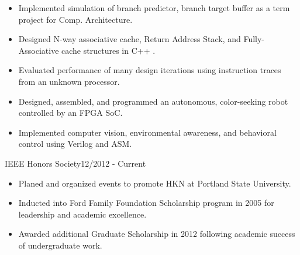 \documentclass{article}
\begin{document}
		\begin{itemize} \setlength{\itemsep}{-4pt}
			\item Implemented simulation of branch predictor, branch target buffer as a term project for Comp. Architecture.
			\item Designed N-way associative cache, Return Address Stack, and Fully-Associative cache structures in C++	.
			\item Evaluated performance of many design iterations using instruction traces from an unknown processor.
		\end{itemize}	
	
	
	\begin{itemize}\setlength{\itemsep}{-4pt}
		\item Designed, assembled, and programmed an autonomous, color-seeking robot controlled by an FPGA SoC.  
		\item Implemented computer vision, environmental awareness, and behavioral control using Verilog and ASM.
	\end{itemize}

		
\vspace{-10pt}
\vspace{3pt}

 {IEEE Honors Society}{12/2012 - Current}

	\begin{itemize} \setlength{\itemsep}{-4pt}	
		\item Planed and organized events to promote HKN at Portland State University.
	\end{itemize}	\vspace{-2pt}


	\begin{itemize} \setlength{\itemsep}{-4pt}
		\item Inducted into Ford Family Foundation Scholarship program in 2005 for leadership and academic excellence.
		\item Awarded additional Graduate Scholarship in 2012 following academic success of undergraduate work.
	\end{itemize}
\end{document}
